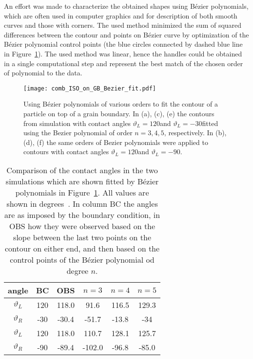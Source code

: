 An effort was made to characterize the obtained shapes using Bézier polynomials, which are often used in computer graphics and for description of both smooth curves and those with corners. The used method minimized the sum of squared differences between the contour and points on Bézier curve by optimization of the Bézier polynomial control points (the blue circles connected by dashed blue line in Figure~\ref{fig_ISO_on_GB_Bezier_fit}). The used method was linear, hence the handles could be obtained in a single computational step and represent the best match of the chosen order of polynomial to the data.

\begin{figure}
	\centering
	\texttt{[image: comb\_ISO\_on\_GB\_Bezier\_fit.pdf]}
	\caption[Fit of the final PF contours of a particle on top of a grain boundary using Bézier polynomials]{Using Bézier polynomials of various orders to fit the contour of a particle on top of a grain boundary. In (a), (c), (e) the contours from simulation with contact angles $\vartheta_L=120$\textdegree and $\vartheta_L=-30$\textdegree fitted using the Bezier polynomial of order $n=3,4,5$, respectively. In (b), (d), (f) the same orders of Bezier polynomials were applied to contours with contact angles $\vartheta_L=120$\textdegree and $\vartheta_L=-90$\textdegree.}
	\label{fig_ISO_on_GB_Bezier_fit}
\end{figure}

\begin{table}
	\centering
	\caption[PF wetting simulation of a particle with isotropic interface energy ona a GB - comparison of measured contact angles]{Comparison of the contact angles in the two simulations which are shown fitted by Bézier polynomials in Figure~\ref{fig_ISO_on_GB_Bezier_fit}. All values are shown in degrees~\textdegree. In column BC the angles are as imposed by the boundary condition, in OBS how they were observed based on the slope between the last two points on the contour on either end, and then based on the control points of the Bézier polynomial od degree $n$.}
	\label{tab_ISO_on_GB_angles_measured}
	\begin{tabular}{c|c|c|c|c|c}
		angle & BC  & OBS & $n=3$ & $n=4$ & $n=5$\\ \hline \hline
		$\vartheta_L$ & 120 & 118.0 & 91.6 & 116.5 & 129.3 \\
		$\vartheta_R$ & -30 & -30.4 & -51.7 & -13.8 & -34   \\ \hline \hline
		$\vartheta_L$ & 120 & 118.0 & 110.7 & 128.1 & 125.7 \\
		$\vartheta_R$ & -90 & -89.4  & -102.0 &-96.8 & -85.0 \\ \hline \hline
	\end{tabular}
\end{table}

